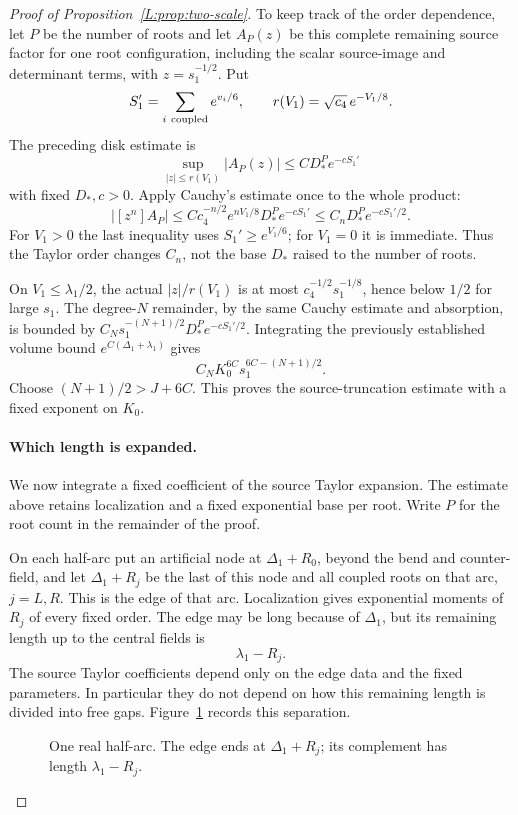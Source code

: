 \begin{proof}[Proof of Proposition~\ref{L:prop:two-scale}]
To keep track of the order dependence, let $P$ be the number of roots and let $A_P(z)$ be this complete
remaining source factor for one root configuration, including the scalar
source-image and determinant terms, with $z=s_1^{-1/2}$. Put
\[
 S_1'=\sum_{i\ {\rm coupled}}e^{v_i/6},\qquad
 r(V_1)=\sqrt{c_4}\,e^{-V_1/8}.
\]
The preceding disk estimate is
\[
 \sup_{|z|\le r(V_1)}|A_P(z)|\le C D_*^P e^{-cS_1'}
\]
with fixed $D_*,c>0$. Apply Cauchy's estimate once to the whole product:
\[
 |[z^n]A_P|\le Cc_4^{-n/2}e^{nV_1/8}D_*^P e^{-cS_1'}
              \le C_nD_*^P e^{-cS_1'/2}.
\]
For $V_1>0$ the last inequality uses $S_1'\ge e^{V_1/6}$; for $V_1=0$
it is immediate. Thus the Taylor order changes $C_n$, not the base
$D_*$ raised to the number of roots.

On $V_1\le\lambda_1/2$, the actual $|z|/r(V_1)$ is at most
$c_4^{-1/2}s_1^{-1/8}$, hence below $1/2$ for large $s_1$.
The degree-$N$ remainder, by the same Cauchy estimate and absorption,
is bounded by $C_Ns_1^{-(N+1)/2}D_*^Pe^{-cS_1'/2}$.
Integrating the previously established volume bound
$e^{C(\Delta_1+\lambda_1)}$ gives
\[
 C_NK_0^{6C}s_1^{6C-(N+1)/2}.
\]
Choose $(N+1)/2>J+6C$. This proves the source-truncation estimate
with a fixed exponent on $K_0$.

\paragraph{Which length is expanded.}
We now integrate a fixed coefficient of the source Taylor expansion.
The estimate above retains localization and a fixed exponential base
per root. Write $P$ for the root count in the remainder of the proof.

On each half-arc put an artificial node at $\Delta_1+R_0$, beyond the
bend and counter-field, and let $\Delta_1+R_j$ be the last of this node
and all coupled roots on that arc, $j=L,R$. This is the edge of that
arc. Localization gives exponential moments of $R_j$ of every fixed
order. The edge may be long because of $\Delta_1$, but its remaining
length up to the central fields is
\[
             \lambda_1-R_j.
\]
The source Taylor coefficients depend only on the edge data and the
fixed parameters. In particular they do not depend on how this
remaining length is divided into free gaps. Figure~\ref{L:fig:two-scale} records this separation.
\begin{figure}[htbp]
\centering
\caption{One real half-arc. The edge ends at $\Delta_1+R_j$;
its complement has length $\lambda_1-R_j$.}
\label{L:fig:two-scale}
\end{figure}


\end{proof}
